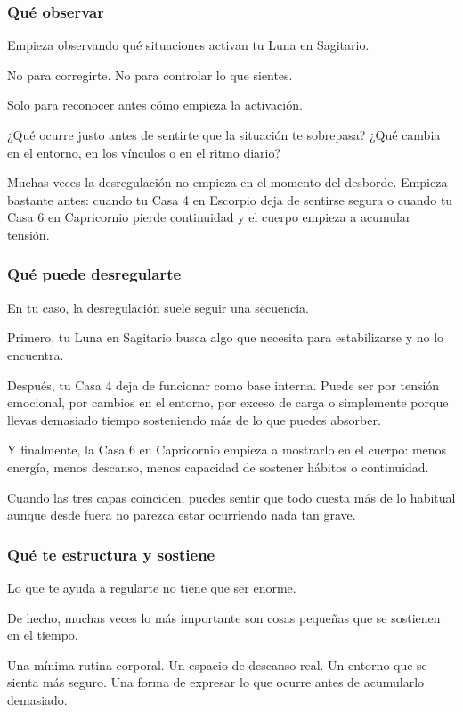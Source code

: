 \documentclass[11pt,a4paper]{article}
\begin{document}
\subsubsection*{Qué observar}

Empieza observando qué situaciones activan tu Luna en Sagitario.

No para corregirte.
No para controlar lo que sientes.

Solo para reconocer antes cómo empieza la activación.

¿Qué ocurre justo antes de sentirte que la situación te sobrepasa?
¿Qué cambia en el entorno, en los vínculos o en el ritmo diario?

Muchas veces la desregulación no empieza en el momento del desborde. Empieza bastante antes: cuando tu Casa 4 en Escorpio deja de sentirse segura o cuando tu Casa 6 en Capricornio pierde continuidad y el cuerpo empieza a acumular tensión.

\subsubsection*{Qué puede desregularte}

En tu caso, la desregulación suele seguir una secuencia.

Primero, tu Luna en Sagitario busca algo que necesita para estabilizarse y no lo encuentra.

Después, tu Casa 4 deja de funcionar como base interna. Puede ser por tensión emocional, por cambios en el entorno, por exceso de carga o simplemente porque llevas demasiado tiempo sosteniendo más de lo que puedes absorber.

Y finalmente, la Casa 6 en Capricornio empieza a mostrarlo en el cuerpo:
menos energía,
menos descanso,
menos capacidad de sostener hábitos o continuidad.

Cuando las tres capas coinciden, puedes sentir que todo cuesta más de lo habitual aunque desde fuera no parezca estar ocurriendo nada tan grave.

\subsubsection*{Qué te estructura y sostiene}

Lo que te ayuda a regularte no tiene que ser enorme.

De hecho, muchas veces lo más importante son cosas pequeñas que se sostienen en el tiempo.

Una mínima rutina corporal.
Un espacio de descanso real.
Un entorno que se sienta más seguro.
Una forma de expresar lo que ocurre antes de acumularlo demasiado.
\end{document}
